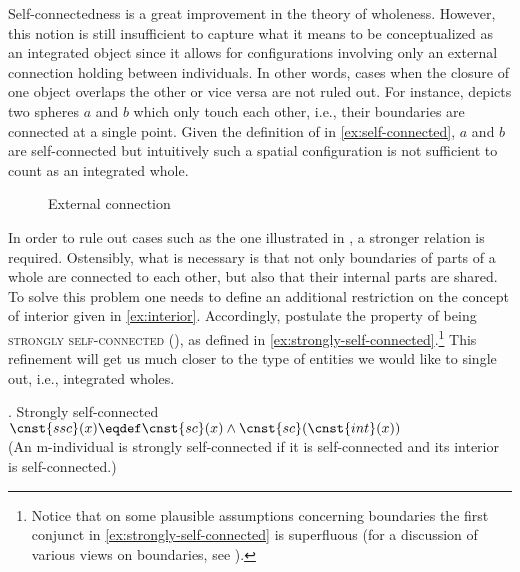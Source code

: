     Self-connectedness is a great improvement in the theory of wholeness. However, this notion is still insufficient to capture what it means to be conceptualized as an integrated object since it allows for configurations involving only an external connection holding between individuals. In other words, cases when the closure of one object overlaps the other or vice versa are not ruled out. For instance,  depicts two spheres $a$ and $b$ which only touch each other, i.e., their boundaries are connected at a single point. Given the definition of  in \ref{ex:self-connected}, $a$ and $b$ are self-connected but intuitively such a spatial configuration is not sufficient to count as an integrated whole.
    
\begin{figure}[h!]
\centering
{}
\caption{External connection}
\label{fig:external-connection}
\end{figure}    
  
In order to rule out cases such as the one illustrated in , a stronger relation is required. Ostensibly, what is necessary is that not only boundaries of parts of a whole are connected to each other, but also that their internal parts are shared. To solve this problem one needs to define an additional restriction on the concept of interior given in \ref{ex:interior}. Accordingly, \citet{casati_varzi1999parts} postulate the property of being \textsc{strongly self-connected} (), as defined in \ref{ex:strongly-self-connected}.\footnote{Notice that on some plausible assumptions concerning boundaries the first conjunct in \ref{ex:strongly-self-connected} is superfluous (for a discussion of various views on boundaries, see \citealt[pp. 61--62, 71--98]{casati_varzi1999parts}).} This refinement will get us much closer to the type of entities we would like to single out, i.e., integrated wholes.

	\ex. Strongly self-connected \citep[p. 60; adapted]{casati_varzi1999parts}\label{ex:strongly-self-connected}\\
    $\cnst{ssc}(x) \eqdef \cnst{sc}(x) \wedge \cnst{sc}(\cnst{int}(x))$\\
    (An m-individual is strongly self-connected if it is self-connected and its interior is self-connected.)
	
